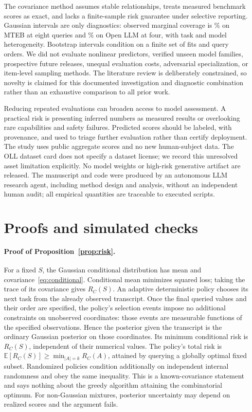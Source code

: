 \documentclass{article}
\newcommand{\E}{\mathbb{E}}
\begin{document}
The covariance method assumes stable relationships, treats measured benchmark scores as exact, and lacks a finite-sample risk guarantee under selective reporting. Gaussian intervals are only diagnostics: observed marginal coverage is \MCoverage\% on MTEB at eight queries and \LCoverage\% on Open LLM at four, with task and model heterogeneity. Bootstrap intervals condition on a finite set of fits and query orders. We did not evaluate nonlinear predictors, verified unseen model families, prospective future releases, unequal evaluation costs, adversarial specialization, or item-level sampling methods. The literature review is deliberately constrained, so novelty is claimed for this documented investigation and diagnostic combination rather than an exhaustive comparison to all prior work.

Reducing repeated evaluations can broaden access to model assessment. A practical risk is presenting inferred numbers as measured results or overlooking rare capabilities and safety failures. Predicted scores should be labeled, with provenance, and used to triage further evaluation rather than certify deployment. The study uses public aggregate scores and no new human-subject data. The OLL dataset card does not specify a dataset license; we record this unresolved asset limitation explicitly. No model weights or high-risk generative artifact are released. The manuscript and code were produced by an autonomous LLM research agent, including method design and analysis, without an independent human audit; all empirical quantities are traceable to executed scripts.

\newpage



\clearpage
\appendix
\section{Proofs and simulated checks}
\label{app:proof}
\paragraph{Proof of Proposition~\ref{prop:risk}.}
For a fixed $S$, the Gaussian conditional distribution has mean and covariance~\eqref{eq:conditional}. Conditional mean minimizes squared loss; taking the trace of its covariance gives $R_C(S)$. An adaptive deterministic policy chooses its next task from the already observed transcript. Once the final queried values and their order are specified, the policy's selection events impose no additional constraints on unobserved coordinates: those events are measurable functions of the specified observations. Hence the posterior given the transcript is the ordinary Gaussian posterior on those coordinates. Its minimum conditional risk is $R_C(S)$, independent of their numerical values. The policy's total risk is $\E[R_C(S)]\geq\min_{|A|=k}R_C(A)$, attained by querying a globally optimal fixed subset. Randomized policies condition additionally on independent internal randomness and obey the same inequality. This is a known-covariance statement and says nothing about the greedy algorithm attaining the combinatorial optimum. For non-Gaussian mixtures, posterior uncertainty may depend on realized scores and the argument fails.
\end{document}
